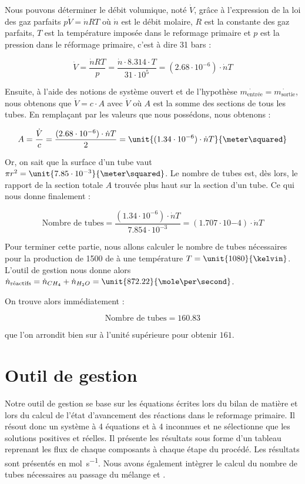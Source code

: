 Nous pouvons déterminer le débit volumique, noté $\dot{V}$, grâce à l'expression de la loi des gaz
parfaits $p\dot{V} = \dot{n}RT$ où $\dot{n}$ est le débit molaire, $R$ est la constante des gaz parfaits,
$T$ est la température imposée dans le reformage primaire et $p$ est la
pression dans le réformage primaire, c'est à dire 31 bars :

$$\dot{V} = \frac{\dot{n}RT}{p} = \frac{\dot{n}\cdot 8.314\cdot T}{31\cdot10^5}
 = (2.68\cdot10^{-6})\cdot \dot{n}T$$

Ensuite, à l'aide des notions de système ouvert et de l'hypothèse 
$\dot{m_{\text{entrée}}} = \dot{m_{\text{sortie}}}$, nous obtenons que $\dot{V} 
= c \cdot  A $ avec $ \dot{V}$ où $A$ est la somme des sections de tous les tubes.
En remplaçant par les valeurs que nous possédons, nous obtenons :

$$A = \frac{\dot{V}}{c} = \frac{(2.68\cdot10^{-6})\cdot \dot{n}T}{2} 
= \unit{(1.34\cdot10^{-6})\cdot \dot{n}T}{\meter\squared}$$

Or, on sait que la surface d'un tube vaut $\pi r^2
= \unit{7.85\cdot10^{-3}}{\meter\squared}$. Le nombre de tubes est,
dès lors, le rapport de la section totale $A$ trouvée plus haut sur
la section d'un tube. Ce qui nous donne finalement : 

$$\text{Nombre de tubes} = \frac{(1.34\cdot10^{-6})\cdot \dot{n}T}{7.854\cdot10^{-3}}
= (1.707\cdot10{-4})\cdot\dot{n}T$$

Pour terminer cette partie, nous allons calculer le nombre de tubes
nécessaires pour la production de \unit{1500}{\ton\per\dday} de 
à une température $T = \unit{1080}{\kelvin}$. L'outil de gestion
nous donne alors $\dot{n}_{\text{réactifs}} = \dot{n}_{CH_4} + \dot{n}_{H_2O} 
= \unit{872.22}{\mole\per\second}$.

On trouve alors immédiatement :

$$\text{Nombre de tubes} = 160.83$$

que l'on arrondit bien sur à l'unité supérieure pour obtenir $161$.

\section{Outil de gestion}
Notre outil de gestion se base sur les équations écrites lors du
bilan de matière et lors du calcul de l'état d'avancement des réactions
dans le reformage primaire. Il résout donc un système à 4 équations
et à 4 inconnues et ne sélectionne que les solutions positives et réelles.
Il présente les résultats sous forme d'un tableau reprenant les flux de chaque
composants à chaque étape du procédé. Les résultats sont présentés en \unit{\mole\per\second}.
Nous avons également intègrer le calcul du nombre de tubes nécessaires au 
passage du mélange  et .

